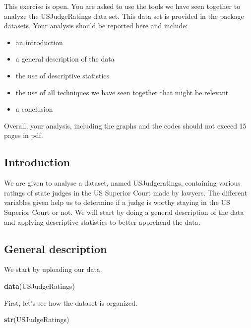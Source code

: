 \documentclass[]{article}
\newenvironment{Shaded}{\begin{snugshade}}{\end{snugshade}}
\newcommand{\KeywordTok}[1]{\textcolor[rgb]{0.13,0.29,0.53}{\textbf{#1}}}
\newcommand{\NormalTok}[1]{#1}
\providecommand{\tightlist}{%
  \setlength{\itemsep}{0pt}\setlength{\parskip}{0pt}}
\begin{document}
This exercise is open. You are asked to use the tools we have seen
together to analyze the USJudgeRatings data set. This data set is
provided in the package datasets. Your analysis should be reported here
and include:

\begin{itemize}
\tightlist
\item
  an introduction
\item
  a general description of the data
\item
  the use of descriptive statistics
\item
  the use of all techniques we have seen together that might be relevant
\item
  a conclusion
\end{itemize}

Overall, your analysis, including the graphs and the codes should not
exceed 15 pages in pdf.

\hypertarget{introduction}{%
\subsection{Introduction}\label{introduction}}

We are given to analyse a dataset, named USJudgeratings, containing
various ratings of state judges in the US Superior Court made by
lawyers. The different variables given help us to determine if a judge
is worthy staying in the US Superior Court or not. We will start by
doing a general description of the data and applying descriptive
statistics to better apprehend the data.

\hypertarget{general-description}{%
\subsection{General description}\label{general-description}}

We start by uploading our data.

\begin{Shaded}
\begin{Highlighting}[]
\KeywordTok{data}\NormalTok{(USJudgeRatings)}
\end{Highlighting}
\end{Shaded}

First, let's see how the dataset is organized.

\begin{Shaded}
\begin{Highlighting}[]
\KeywordTok{str}\NormalTok{(USJudgeRatings)}
\end{Highlighting}
\end{Shaded}
\end{document}
